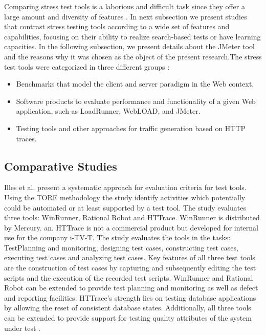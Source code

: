\documentclass[espaco=umemeio,chapter=TITLE,twoside,openright]{abnt}
\begin{document}
Comparing stress test tools is a laborious and difficult task since they offer a large amount and diversity of features \cite{Dustin1999}. In next subsection we present studies that contrast stress testing tools according to a wide set of features and capabilities, focusing on their ability to realize search-based tests or have learning capacities. In the following subsection, we present details about the JMeter tool and the reasons why it was chosen as the object of the present research.The stress test tools were categorized in three different groups \cite{MohammadS.Obaidat}:

\begin{itemize}
\item Benchmarks that model the client and server paradigm in the Web context.
\item Software products to evaluate performance and functionality of a given Web application, such as LoadRunner, WebLOAD, and JMeter.
\item Testing tools and other approaches for traffic generation based on HTTP traces.
\end{itemize}

\subsection{Comparative Studies}

Illes et al. present a systematic approach for evaluation criteria for test tools. Using the TORE methodology the study identify activities which potentially could be automated or at least supported by a test tool. The study evaluates three tools: WinRunner, Rational Robot and HTTrace. WinRunner is distributed by Mercury.  an. HTTrace is not a commercial product but developed for internal use for the company i-TV-T. The study evaluates the tools in the tasks: TestPlanning and monitoring, designing test cases, constructing test cases, executing test cases and analyzing test cases. Key features of all three test tools are the construction of test cases by
capturing and subsequently editing the test scripts and the execution of the recorded test
scripts.  WinRunner and Rational Robot can be extended to provide test planning and monitoring as well as defect and reporting facilities. HTTrace’s strength lies on testing database applications by allowing the reset of consistent database states. Additionally, all three tools can be extended to provide support for testing quality attributes of the system under test \cite{Illes2005}.
\end{document}
